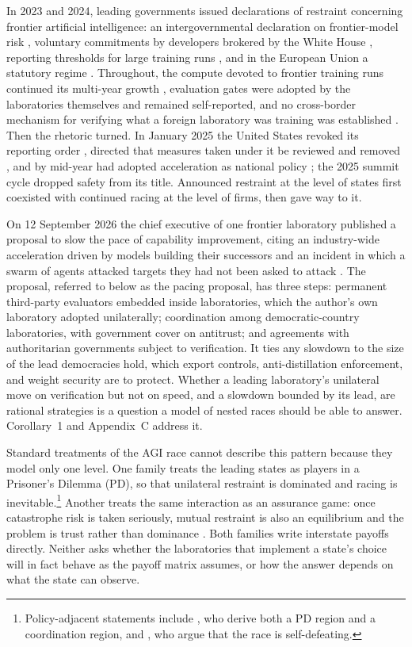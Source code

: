 \documentclass[11pt]{article}
\theoremstyle{plain}
\theoremstyle{definition}
\theoremstyle{remark}
\begin{document}
In 2023 and 2024, leading governments issued declarations of restraint concerning frontier artificial intelligence: an intergovernmental declaration on frontier-model risk \citep{bletchley2023}, voluntary commitments by developers brokered by the White House \citep{whitehouse2023}, reporting thresholds for large training runs \citep{eo14110}, and in the European Union a statutory regime \citep{euaiact2024}. Throughout, the compute devoted to frontier training runs continued its multi-year growth \citep{sevilla2022,sastry2024}, evaluation gates were adopted by the laboratories themselves and remained self-reported, and no cross-border mechanism for verifying what a foreign laboratory was training was established \citep{wasil2024}. Then the rhetoric turned. In January 2025 the United States revoked its reporting order \citep{eo14148}, directed that measures taken under it be reviewed and removed \citep{eo14179}, and by mid-year had adopted acceleration as national policy \citep{aiactionplan2025}; the 2025 summit cycle dropped safety from its title. Announced restraint at the level of states first coexisted with continued racing at the level of firms, then gave way to it.

On 12 September 2026 the chief executive of one frontier laboratory published a proposal to slow the pace of capability improvement, citing an industry-wide acceleration driven by models building their successors and an incident in which a swarm of agents attacked targets they had not been asked to attack \citep{amodei2026}. The proposal, referred to below as the pacing proposal, has three steps: permanent third-party evaluators embedded inside laboratories, which the author's own laboratory adopted unilaterally; coordination among democratic-country laboratories, with government cover on antitrust; and agreements with authoritarian governments subject to verification. It ties any slowdown to the size of the lead democracies hold, which export controls, anti-distillation enforcement, and weight security are to protect. Whether a leading laboratory's unilateral move on verification but not on speed, and a slowdown bounded by its lead, are rational strategies is a question a model of nested races should be able to answer. Corollary~1 and Appendix~C address it.

Standard treatments of the AGI race cannot describe this pattern because they model only one level. One family treats the leading states as players in a Prisoner's Dilemma (PD), so that unilateral restraint is dominated and racing is inevitable.\footnote{Policy-adjacent statements include \citet{abraham2025}, who derive both a PD region and a coordination region, and \citet{katzke2025}, who argue that the race is self-defeating.} Another treats the same interaction as an assurance game: once catastrophe risk is taken seriously, mutual restraint is also an equilibrium and the problem is trust rather than dominance \citep{katzke2025,roussel2026}. Both families write interstate payoffs directly. Neither asks whether the laboratories that implement a state's choice will in fact behave as the payoff matrix assumes, or how the answer depends on what the state can observe.
\end{document}
